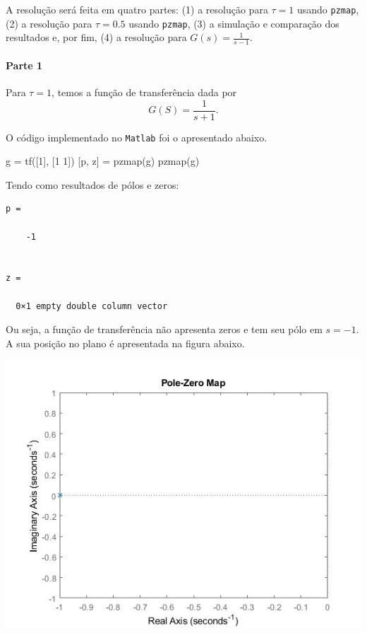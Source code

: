 \documentclass[
]{book}
\newenvironment{Shaded}{\begin{snugshade}}{\end{snugshade}}
\newcommand{\FloatTok}[1]{\textcolor[rgb]{0.00,0.00,0.81}{#1}}
\newcommand{\NormalTok}[1]{#1}
\theoremstyle{definition}
\theoremstyle{definition}
\theoremstyle{definition}
\theoremstyle{remark}
\begin{document}
A resolução será feita em quatro partes: (1) a resolução para \(\tau = 1\) usando \texttt{pzmap}, (2) a resolução para \(\tau = 0.5\) usando \texttt{pzmap}, (3) a simulação e comparação dos resultados e, por fim, (4) a resolução para \(G(s) =\frac {1}{s-1}\).

\hypertarget{parte-1}{%
\paragraph{Parte 1}\label{parte-1}}

Para \(\tau = 1\), temos a função de transferência dada por
\[
G(S)= \frac {1}{s+1}.
\]

O código implementado no \texttt{Matlab} foi o apresentado abaixo.

\begin{Shaded}
\begin{Highlighting}[]
\NormalTok{g = tf([}\FloatTok{1}\NormalTok{], [}\FloatTok{1} \FloatTok{1}\NormalTok{])}
\NormalTok{[p, z] = pzmap(g)}
\NormalTok{pzmap(g)}
\end{Highlighting}
\end{Shaded}

Tendo como resultados de pólos e zeros:

\begin{verbatim}
p =

    -1


z =

  0×1 empty double column vector
\end{verbatim}

Ou seja, a função de transferência não apresenta zeros e tem seu pólo em \(s = -1\). A sua posição no plano é apresentada na figura abaixo.

\includegraphics{Imagens/Lab2/tau1.jpg}
\end{document}
